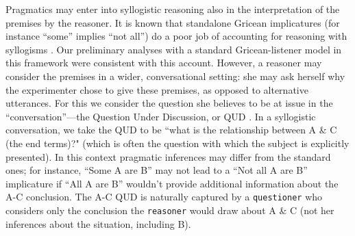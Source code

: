 \documentclass[10pt,letterpaper]{article}
\begin{document}
Pragmatics may enter into syllogistic reasoning also in the interpretation of the premises by the reasoner. It is known that standalone Gricean implicatures (for instance ``some'' implies ``not all'') do a poor job of accounting for reasoning with syllogisms \cite{Roberts2001}. Our preliminary analyses with a standard Gricean-listener model in this framework were consistent with this account. 
However, a reasoner may consider the premises in a wider, conversational setting: she may ask herself why the experimenter chose to give these premises, as opposed to alternative utterances. For this we consider the question she believes to be at issue in the ``conversation''---the Question Under Discussion, or QUD \cite{Roberts2004QUD}. In a syllogistic conversation, we take the QUD to be ``what is the relationship between A \& C (the end terms)?" (which is often the question with which the subject is explicitly presented). In this context pragmatic inferences may differ from the standard ones; for instance, ``Some A are B'' may not lead to a ``Not all A are B'' implicature if ``All A are B'' wouldn't provide additional information about the A-C conclusion. The A-C QUD is naturally captured by a \lstinline{questioner} who considers only the conclusion the \lstinline{reasoner} would draw about A \& C (not her inferences about the situation, including B).

\end{document}

